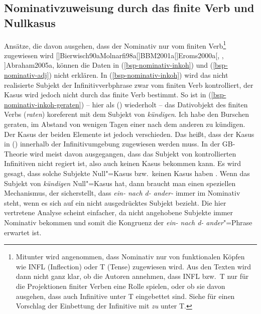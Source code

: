 \subsection{Nominativzuweisung durch das finite Verb und Nullkasus}
\label{sec-kasus-fin-verb-nullkasus}

Ansätze, die davon ausgehen, dass der Nominativ nur vom finiten Verb\footnote{
  Mitunter wird angenommen, dass Nominativ nur von funktionalen Köpfen wie INFL (Inflection) oder T (Tense) zugewiesen
  wird. Aus den Texten wird dann nicht ganz klar, ob die Autoren annehmen, dass INFL bzw.\ T nur für
  die Projektionen finiter Verben eine Rolle spielen, oder ob sie davon ausgehen, dass auch
  Infinitive unter T eingebettet sind. Siehe \citet[]{Wurmbrand2003a} für einen Vorschlag der Einbettung
  der Infinitive mit \emph{zu} unter T.%
} zugewiesen wird
%
\parencites[]{Chomsky93a}[]{Haider84b}[]{FF87a}%
[]{Bierwisch90a}{Molnarfi98a}[]{BBM2001a}[]{Eroms2000a}[, , ]{Abraham2005a}, 
können die Daten in (\ref{bsp-nominativ-inkoh}) und (\ref{bsp-nominativ-adj}) nicht erklären.
In (\ref{bsp-nominativ-inkoh}) wird das nicht realisierte Subjekt der Infinitivverbphrase
zwar vom finiten Verb kontrolliert, der Kasus wird jedoch nicht durch das finite Verb
bestimmt. So ist \zb in (\ref{bsp-nominativ-inkoh-geraten}) -- hier als () wiederholt -- das Dativobjekt 
des finiten Verbs (\emph{raten}) koreferent mit dem Subjekt von \emph{kündigen}. 
\ea
Ich habe den Burschen geraten, im Abstand von wenigen Tagen einer nach dem anderen zu kündigen.
\z
Der Kasus der beiden Elemente ist jedoch verschieden. Das heißt, dass der Kasus in ()
innerhalb der Infinitivumgebung zugewiesen werden muss. In der GB-Theorie wird meist davon
ausgegangen, dass das Subjekt von kontrollierten Infinitiven nicht regiert ist, also auch
keinen Kasus bekommen kann. Es wird gesagt, dass solche Subjekte Null"=Kasus bzw.\ keinen Kasus
haben \parencites[]{Grewendorf88a}[]{Frey93a}.
Wenn das Subjekt von \emph{kündigen} Null"=Kasus hat,
dann braucht man einen speziellen Mechanismus, der sicherstellt,
dass \emph{ein- nach d- ander-} immer im Nominativ steht, wenn es sich auf ein nicht 
ausgedrücktes Subjekt bezieht. Die hier vertretene Analyse scheint einfacher,
da nicht angehobene Subjekte immer Nominativ bekommen und somit
die Kongruenz der \emph{ein- nach d- ander}"=Phrase erwartet ist.




